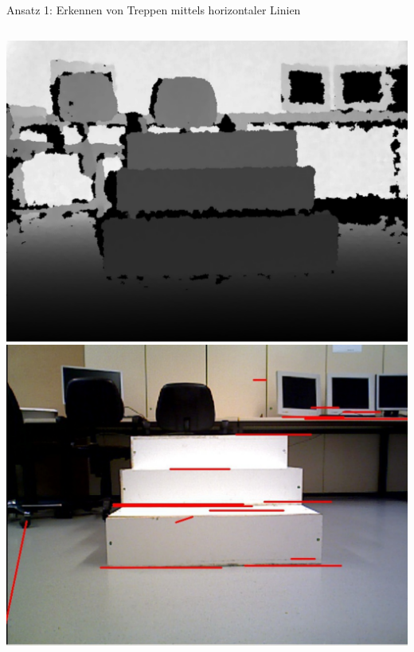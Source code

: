 \documentclass[18pt]{beamer}
\begin{document}
\begin{frame}{Ansatz 1: Erkennen von Treppen mittels horizontaler Linien}
\begin{columns}
	\includegraphics[scale=0.16]{images/canny01.pdf}\newline
	\includegraphics[scale=0.16]{images/canny03.pdf}
\end{columns}
\end{frame}
\end{document}
